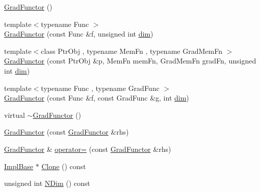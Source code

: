 \begin{DoxyCompactItemize}
\item 
\mbox{\hyperlink{classROOT_1_1Math_1_1GradFunctor_a68c75192981688e292ee84be652a8ec4}{Grad\+Functor}} ()
\item 
{\footnotesize template$<$typename Func $>$ }\\\mbox{\hyperlink{classROOT_1_1Math_1_1GradFunctor_a9cdbcd3d49494b4209524b3c5b3172d2}{Grad\+Functor}} (const Func \&f, unsigned int \mbox{\hyperlink{irrep__util_8cc_a70b5e28b5bc3d1b63a7435c5fe50b837}{dim}})
\item 
{\footnotesize template$<$class Ptr\+Obj , typename Mem\+Fn , typename Grad\+Mem\+Fn $>$ }\\\mbox{\hyperlink{classROOT_1_1Math_1_1GradFunctor_af7c06950b37bea8844b81f53b0bf41df}{Grad\+Functor}} (const Ptr\+Obj \&p, Mem\+Fn mem\+Fn, Grad\+Mem\+Fn grad\+Fn, unsigned int \mbox{\hyperlink{irrep__util_8cc_a70b5e28b5bc3d1b63a7435c5fe50b837}{dim}})
\item 
{\footnotesize template$<$typename Func , typename Grad\+Func $>$ }\\\mbox{\hyperlink{classROOT_1_1Math_1_1GradFunctor_a079a63821986eb0ce6e011c366c1cb9a}{Grad\+Functor}} (const Func \&f, const Grad\+Func \&g, int \mbox{\hyperlink{irrep__util_8cc_a70b5e28b5bc3d1b63a7435c5fe50b837}{dim}})
\item 
virtual \mbox{\hyperlink{classROOT_1_1Math_1_1GradFunctor_a1dfc4e8382f679a935eae97c5e7ee4dd}{$\sim$\+Grad\+Functor}} ()
\item 
\mbox{\hyperlink{classROOT_1_1Math_1_1GradFunctor_a629b55d9f326dbf39e5c3ccfb4678579}{Grad\+Functor}} (const \mbox{\hyperlink{classROOT_1_1Math_1_1GradFunctor}{Grad\+Functor}} \&rhs)
\item 
\mbox{\hyperlink{classROOT_1_1Math_1_1GradFunctor}{Grad\+Functor}} \& \mbox{\hyperlink{classROOT_1_1Math_1_1GradFunctor_a7f7a0c6b466d283cb6085f0e57ab1e6a}{operator=}} (const \mbox{\hyperlink{classROOT_1_1Math_1_1GradFunctor}{Grad\+Functor}} \&rhs)
\item 
\mbox{\hyperlink{classROOT_1_1Math_1_1GradFunctor_a1fb9161fc93c7e7fa185dddbcc2c4f4d}{Impl\+Base}} $\ast$ \mbox{\hyperlink{classROOT_1_1Math_1_1GradFunctor_a21093c0d3001069e49ce6278b5a32a40}{Clone}} () const
\item 
unsigned int \mbox{\hyperlink{classROOT_1_1Math_1_1GradFunctor_a7ff4ed4ad6f7c17d74403a443990f069}{N\+Dim}} () const
\end{DoxyCompactItemize}


